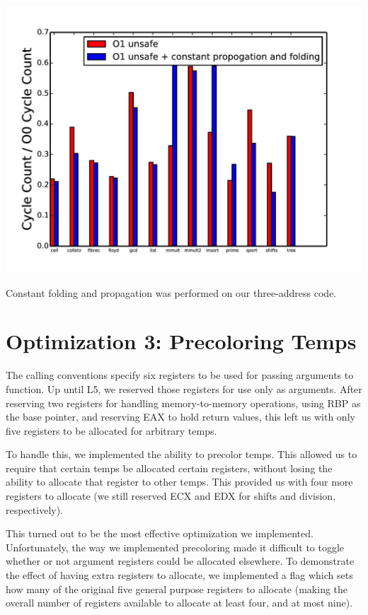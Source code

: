 \documentclass{article}
\begin{document}
\includegraphics[scale=0.5]{O1_vs_constOpts-page-001}

Constant folding and propagation was performed on our three-address code.

\section{Optimization 3: Precoloring Temps}

The calling conventions specify six registers to be used for passing arguments to function. Up until L5, we reserved those registers for use only as arguments. After reserving two registers for handling memory-to-memory operations, using RBP as the base pointer, and reserving EAX to hold return values, this left us with only five registers to be allocated for arbitrary temps.

To handle this, we implemented the ability to precolor temps. This allowed us to require that certain temps be allocated certain registers, without losing the ability to allocate that register to other temps. This provided us with four more registers to allocate (we still reserved ECX and EDX for shifts and division, respectively). 

This turned out to be the most effective optimization we implemented. Unfortunately, the way we implemented precoloring made it difficult to toggle whether or not argument registers could be allocated elsewhere. To demonstrate the effect of having extra registers to allocate, we implemented a flag which sets how many of the original five general purpose registers to allocate (making the overall number of registers available to allocate at least four, and at most nine).
\end{document}
